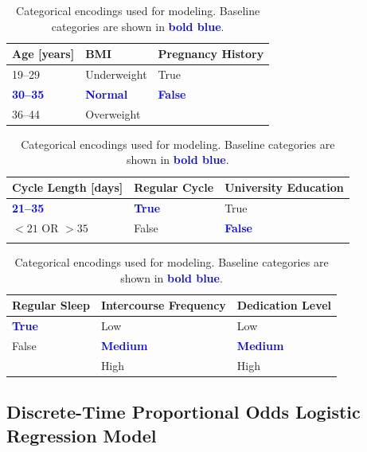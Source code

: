 \documentclass[11pt]{article}
\begin{document}
\begin{table}[h]
\centering
\caption{Categorical encodings used for modeling. Baseline categories are shown in \textcolor{blue}{\textbf{bold blue}}.}
\label{tab:model_encodings}

\begin{tabularx}{\textwidth}{X X X}
\textbf{Age [years]} & \textbf{BMI} & \textbf{Pregnancy History} \\
\hline
19--29 & Underweight & True \\
\textcolor{blue}{\textbf{30--35}} & \textcolor{blue}{\textbf{Normal}} & \textcolor{blue}{\textbf{False}} \\
36--44 & Overweight & \\
\end{tabularx}
\vspace{1em}

\begin{tabularx}{\textwidth}{X X X}
\textbf{Cycle Length [days]} & \textbf{Regular Cycle} & \textbf{University Education} \\
\hline
\textcolor{blue}{\textbf{21--35}} & \textcolor{blue}{\textbf{True}} & True \\
\(<21\) OR \(>35\) & False & \textcolor{blue}{\textbf{False}} \\
 & & \\
\end{tabularx}
\vspace{1em}

\begin{tabularx}{\textwidth}{X X X}
\textbf{Regular Sleep} & \textbf{Intercourse Frequency} & \textbf{Dedication Level} \\
\hline
\textcolor{blue}{\textbf{True}} & Low & Low \\
False & \textcolor{blue}{\textbf{Medium}} & \textcolor{blue}{\textbf{Medium}} \\
& High & High \\
\end{tabularx}

\vspace{1em}

\captionsetup{justification=justified}
\end{table}


\subsection{Discrete-Time Proportional Odds Logistic Regression Model}
\end{document}
